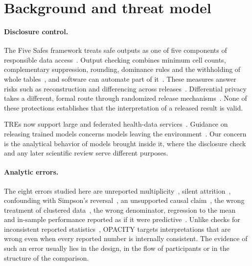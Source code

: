 \section{Background and threat model}
\label{sec:background}

\paragraph{Disclosure control.}
The Five Safes framework treats safe outputs as one of five components of responsible data access~\cite{fivesafes,ritchie2017fivesafes}. Output checking combines minimum cell counts, complementary suppression, rounding, dominance rules and the withholding of whole tables~\cite{hundepool2012,griffiths2019handbook}, and software can automate part of it~\cite{acro,sacro2024,alves2020runners}. These measures answer risks such as reconstruction and differencing across releases~\cite{dinur2003,denning1979}. Differential privacy takes a different, formal route through randomized release mechanisms~\cite{dwork2006}. None of these protections establishes that the interpretation of a released result is valid.

TREs now support large and federated health-data services~\cite{opensafely2020,hdruk2020tre,kavianpour2022tre}. Guidance on releasing trained models concerns models leaving the environment~\cite{jefferson2022graimatter}. Our concern is the analytical behavior of models brought inside it, where the disclosure check and any later scientific review serve different purposes.

\paragraph{Analytic errors.}
The eight errors studied here are unreported multiplicity~\cite{benjamini1995,gelman2014garden,simmons2011false}, silent attrition~\cite{vandenbroucke2007strobe}, confounding with Simpson's reversal~\cite{simpson1951,bickel1975,pearl2014simpson}, an unsupported causal claim~\cite{hernan2020whatif}, the wrong treatment of clustered data~\cite{cornfield1978,donner2000cluster}, the wrong denominator, regression to the mean~\cite{galton1886,barnett2005rtm} and in-sample performance reported as if it were predictive~\cite{steyerberg2001internal,collins2015tripod}. Unlike checks for inconsistent reported statistics~\cite{nuijten2016statcheck,brown2017grim}, OPACITY targets interpretations that are wrong even when every reported number is internally consistent. The evidence of such an error usually lies in the design, in the flow of participants or in the structure of the comparison.

